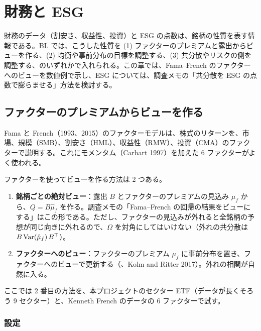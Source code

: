 \chapter{財務と ESG}\label{ch:esg}

財務のデータ（割安さ、収益性、投資）と ESG の点数は、銘柄の性質を表す情報である。BL では、こうした性質を (1) ファクターのプレミアムと露出からビューを作る、(2) 均衡や事前分布の目標を調整する、(3) 共分散やリスクの側を調整する、のいずれかで入れられる。この章では、Fama--French のファクターへのビューを数値例で示し、ESG については、調査メモの「共分散を ESG の点数で膨らませる」方法を検討する。

\section{ファクターのプレミアムからビューを作る}

Fama と French（1993、2015）のファクターモデルは、株式のリターンを、市場、規模（SMB）、割安さ（HML）、収益性（RMW）、投資（CMA）のファクターで説明する。これにモメンタム（Carhart 1997）を加えた 6 ファクターがよく使われる。

ファクターを使ってビューを作る方法は 2 つある。

\begin{enumerate}
\item \textbf{銘柄ごとの絶対ビュー}：露出 $B$ とファクターのプレミアムの見込み $\hat\mu_f$ から、$Q=B\hat\mu_f$ を作る。調査メモの「Fama--French の回帰の結果をビューにする」はこの形である。ただし、ファクターの見込みが外れると全銘柄の予想が同じ向きに外れるので、$\Omega$ を対角にしてはいけない（外れの共分散は $B\,\mathrm{Var}(\hat\mu_f)\,B^{\top}$）。
\item \textbf{ファクターへのビュー}：ファクターのプレミアム $\mu_f$ に事前分布を置き、ファクターへのビューで更新する（、Kolm and Ritter 2017）。外れの相関が自然に入る。
\end{enumerate}

ここでは 2 番目の方法を、本プロジェクトのセクター ETF（データが長くそろう 9 セクター）と、Kenneth French のデータの 6 ファクターで試す。

\subsection*{設定}

